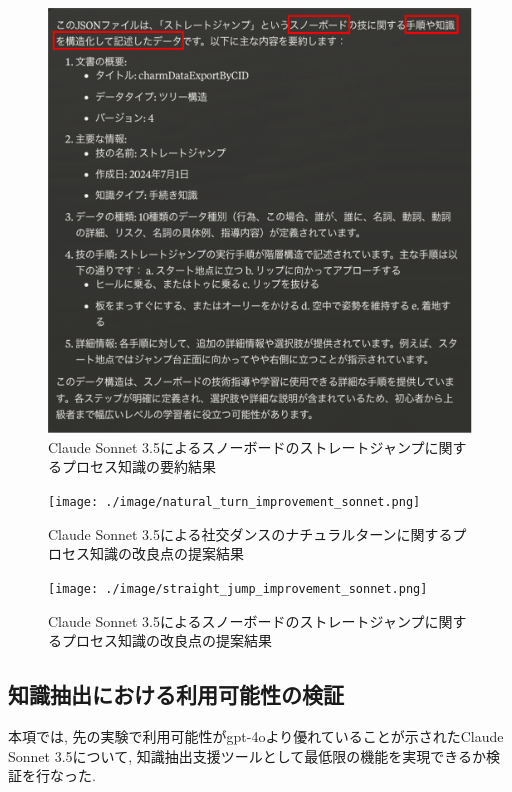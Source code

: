 \begin{figure}[htbp]
    \centering
    \includegraphics[width=1.0\linewidth]{./image/straight_jump_summarize_sonnet.png}
    \caption{Claude Sonnet 3.5によるスノーボードのストレートジャンプに関するプロセス知識の要約結果}
    \label{fig10}
\end{figure}
\begin{figure}[htbp]
    \centering
    \texttt{[image: ./image/natural\_turn\_improvement\_sonnet.png]}
    \caption{Claude Sonnet 3.5による社交ダンスのナチュラルターンに関するプロセス知識の改良点の提案結果}
    \label{fig11}
\end{figure}

\begin{figure}[htbp]
    \centering
    \texttt{[image: ./image/straight\_jump\_improvement\_sonnet.png]}
    \caption{Claude Sonnet 3.5によるスノーボードのストレートジャンプに関するプロセス知識の改良点の提案結果}
    \label{fig12}
\end{figure}


\subsection{知識抽出における利用可能性の検証}
本項では, 先の実験で利用可能性がgpt-4oより優れていることが示されたClaude Sonnet 3.5について, 知識抽出支援ツールとして最低限の機能を実現できるか検証を行なった.

